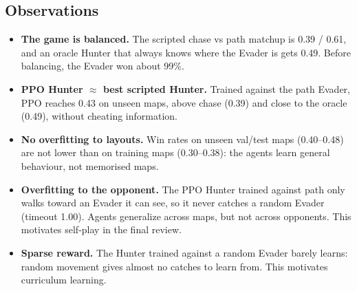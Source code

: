 \documentclass[11pt,a4paper]{article}
\begin{document}
\subsection{Observations}
\begin{itemize}
  \item \textbf{The game is balanced.} The scripted chase vs path matchup is 0.39 / 0.61, and an
        oracle Hunter that always knows where the Evader is gets 0.49. Before balancing, the Evader
        won about 99\%.
  \item \textbf{PPO Hunter $\approx$ best scripted Hunter.} Trained against the path Evader, PPO
        reaches 0.43 on unseen maps, above chase (0.39) and close to the oracle (0.49), without
        cheating information.
  \item \textbf{No overfitting to layouts.} Win rates on unseen val/test maps (0.40--0.48) are
        not lower than on training maps (0.30--0.38): the agents learn general behaviour, not
        memorised maps.
  \item \textbf{Overfitting to the opponent.} The PPO Hunter trained against path only walks toward
        an Evader it can see, so it never catches a random Evader (timeout 1.00). Agents generalize
        across maps, but not across opponents. This motivates self-play in the final review.
  \item \textbf{Sparse reward.} The Hunter trained against a random Evader barely learns: random
        movement gives almost no catches to learn from. This motivates curriculum learning.
\end{itemize}

\end{document}
